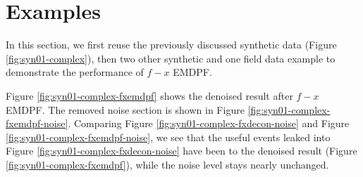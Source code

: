 

\section{Examples}

In this section, we first reuse the previously discussed synthetic data (Figure \ref{fig:syn01-complex}), then  two other synthetic  and one field data example to demonstrate the performance of ${f-x}$ EMDPF.

Figure \ref{fig:syn01-complex-fxemdpf} shows the denoised result after $f-x$ EMDPF. The removed noise section is shown in Figure \ref{fig:syn01-complex-fxemdpf-noise}. 
Comparing Figure \ref{fig:syn01-complex-fxdecon-noise} and Figure \ref{fig:syn01-complex-fxemdpf-noise}, we see that the useful events leaked into Figure \ref{fig:syn01-complex-fxdecon-noise} have been  to the denoised result (Figure \ref{fig:syn01-complex-fxemdpf}), while the noise level stays nearly unchanged.

